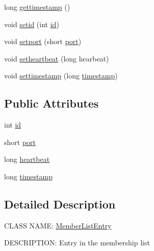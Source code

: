 \begin{DoxyCompactItemize}
long \hyperlink{class_member_list_entry_a43ae4ad31cccb03ad3ad8d3be7ca0e94}{gettimestamp} ()
\item 
void \hyperlink{class_member_list_entry_a7f5a04a841d491ef763cea6044a09ac1}{setid} (int \hyperlink{class_member_list_entry_a569594f798c011bec978d7de9af9e87c}{id})
\item 
void \hyperlink{class_member_list_entry_a4fd316a274905e869f091ac7cf384d7b}{setport} (short \hyperlink{class_member_list_entry_ae85ba26966dc188c7fec4c298fb47a81}{port})
\item 
void \hyperlink{class_member_list_entry_a08de1a1497e8930ddf823ba44f2a4d06}{setheartbeat} (long hearbeat)
\item 
void \hyperlink{class_member_list_entry_a963926fcfbe441fa4ddb1963ddff822d}{settimestamp} (long \hyperlink{class_member_list_entry_ae15f1e7b93b9f19be264930c783615cc}{timestamp})
\end{DoxyCompactItemize}
\subsection*{\-Public \-Attributes}
\begin{DoxyCompactItemize}
\item 
int \hyperlink{class_member_list_entry_a569594f798c011bec978d7de9af9e87c}{id}
\item 
short \hyperlink{class_member_list_entry_ae85ba26966dc188c7fec4c298fb47a81}{port}
\item 
long \hyperlink{class_member_list_entry_ae01ac985a9a529b0046bc463e97b9a52}{heartbeat}
\item 
long \hyperlink{class_member_list_entry_ae15f1e7b93b9f19be264930c783615cc}{timestamp}
\end{DoxyCompactItemize}


\subsection{\-Detailed \-Description}
\-C\-L\-A\-S\-S \-N\-A\-M\-E\-: \hyperlink{class_member_list_entry}{\-Member\-List\-Entry}

\-D\-E\-S\-C\-R\-I\-P\-T\-I\-O\-N\-: \-Entry in the membership list 

